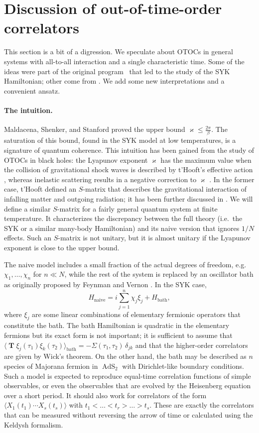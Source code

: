 \documentclass[12pt]{article}
\newcommand*{\corr}[1]{\langle{#1}\rangle}
\renewcommand{\le}{\leqslant}
\newcommand{\kap}{\varkappa}
\DeclareMathOperator{\TT}{\mathbf{T}}
\DeclareMathOperator{\AdS}{AdS}
\newcommand{\naive}{\text{naive}}
\newcommand{\bath}{\text{bath}}
\def\eg{e.g.\ }
\def\ie{i.e.\ }
\begin{document}
\section{Discussion of out-of-time-order correlators}\label{sec_OTOC}

This section is a bit of a digression. We speculate about OTOCs in general systems with all-to-all interaction and a single characteristic time. Some of the ideas were part of the original program~\cite{Kit.BPS} that led to the study of the SYK Hamiltonian; other come from \cite{RSS14,ShSt14,MSS15}. We add some new interpretations and a convenient ansatz.

\paragraph{The intuition.}
Maldacena, Shenker, and Stanford \cite{MSS15} proved the upper bound $\kap\le\frac{2\pi}{\beta}$. The saturation of this bound, found in the SYK model at low temperatures, is a signature of quantum coherence. This intuition has been gained from the study of OTOCs in black holes: the Lyapunov exponent $\kap$ has the maximum value when the collision of gravitational shock waves is described by t'Hooft's effective action \cite{tH87,tH90,tH96}, whereas inelastic scattering results in a negative correction to $\kap$ \cite{ShSt14}. In the former case, t'Hooft defined an $S$-matrix that describes the gravitational interaction of infalling matter and outgoing radiation; it has been further discussed in \cite{KVV95,Pol15}. We will define a similar $S$-matrix for a fairly general quantum system at finite temperature. It characterizes the discrepancy between the full theory (\ie the SYK or a similar many-body Hamiltonian) and its naive version that ignores $1/N$ effects. Such an $S$-matrix is not unitary, but it is almost unitary if the Lyapunov exponent is close to the upper bound.

The naive model includes a small fraction of the actual degrees of freedom, \eg $\chi_1,\dots,\chi_n$ for $n\ll N$, while the rest of the system is replaced by an oscillator bath as originally proposed by Feynman and Vernon \cite{FeVe63}. In the SYK case,
\begin{equation}
H_{\naive}=i\sum_{j=1}^{n}\chi_j\xi_j+H_{\bath},
\end{equation}
where $\xi_j$ are some linear combinations of elementary fermionic operators that constitute the bath. The bath Hamiltonian is quadratic in the elementary fermions but its exact form is not important; it is sufficient to assume that $\corr{\TT\xi_j(\tau_1)\xi_k(\tau_2)}_{\bath} =-\Sigma(\tau_1,\tau_2)\,\delta_{jk}$ and that the higher-order correlators are given by Wick's theorem. On the other hand, the bath may be described as $n$ species of Majorana fermion in $\AdS_2$ with Dirichlet-like boundary conditions. Such a model is expected to reproduce equal-time correlation functions of simple observables, or even the observables that are evolved by the Heisenberg equation over a short period. It should also work for correlators of the form $\corr{X_1(t_1)\cdots X_{s}(t_s)}$ with $t_1<\dots<t_r>\dots>t_s$. These are exactly the correlators that can be measured without reversing the arrow of time or calculated using the Keldysh formalism.
\end{document}
